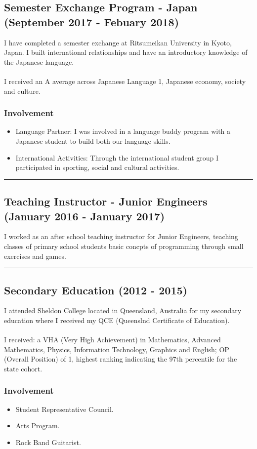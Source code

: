 \subsection*{Semester Exchange Program - Japan (September 2017 - Febuary 2018)}
I have completed a semester exchange at Ritsumeikan University in Kyoto, Japan. I built international relationships and have an introductory knowledge of the Japanese language.\\
\\
I received an A average across Japanese Language 1, Japanese economy, society and culture.

\subsubsection*{Involvement}
\begin{itemize}
  \setlength\itemsep{0.1em}
  \item Language Partner: I was involved in a language buddy program with a Japanese student to build both our language skills.
  \item International Activities: Through the international student group I participated in sporting, social and cultural activities.
\end{itemize}

\noindent\rule{\textwidth}{0.5pt}

\subsection*{Teaching Instructor - Junior Engineers (January 2016 - January 2017)}

I worked as an after school teaching instructor for Junior Engineers, teaching classes of primary school students basic concpts of programming through small exercises and games.

\noindent\rule{\textwidth}{0.5pt}

\subsection*{Secondary Education (2012 - 2015)}

I attended Sheldon College located in Queensland, Australia for my secondary education where I received my QCE (Queenslnd Certificate of Education).\\
\\
I received: a VHA (Very High Achievement) in Mathematics, Advanced Mathematics, Physics, Information Technology, Graphics and English; OP (Overall Position) of 1, highest ranking indicating the 97th percentile for the state cohort.

\subsubsection*{Involvement}

\begin{itemize}
  \setlength\itemsep{0.1em}
  \item Student Representative Council.
  \item Arts Program.
  \item Rock Band Guitarist.
\end{itemize}

